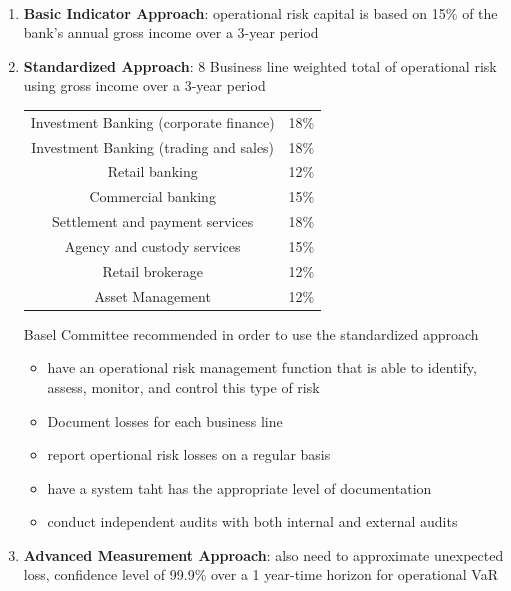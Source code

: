 \documentclass[11pt,fleqn]{book} %
\numberwithin{equation}{section} %
\numberwithin{figure}{section} %
\numberwithin{table}{section} %
\begin{document}
\begin{definition}
    \textbf{}\\
    \begin{enumerate}
        \item \textbf{Basic Indicator Approach}: operational risk capital is based on 15\% of the bank's annual gross income over a 3-year period
        \item \textbf{Standardized Approach}: 8 Business line weighted total of operational risk using gross income over a 3-year period
        \begin{center}
            \begin{tabular}{c|c}
                Investment Banking (corporate finance)&18\%\\
                Investment Banking (trading and sales)&18\%\\
                Retail banking&12\%\\
                Commercial banking&15\%\\
                Settlement and payment services&18\%\\
                Agency and custody services&15\%\\
                Retail brokerage&12\%\\
                Asset Management&12\%\\
            \end{tabular}
        \end{center}
        Basel Committee recommended in order to use the standardized approach
        \begin{itemize}
            \item have an operational risk management function that is able to identify, assess, monitor, and control this type of risk
            \item Document losses for each business line
            \item report opertional risk losses on a regular basis
            \item have a system taht has the appropriate level of documentation
            \item conduct independent audits with both internal and external audits
        \end{itemize}
        \item \textbf{Advanced Measurement Approach}: also need to approximate unexpected loss, confidence level of 99.9\% over a 1 year-time horizon for operational VaR
    \end{enumerate}
\end{definition}
\end{document}
